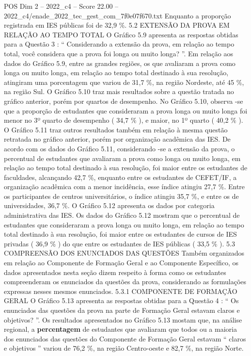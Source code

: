 \begin{textsample}{POS Dim 2 – 2022\_c4 – Score 22.00 – 2022\_c4/enade\_2022\_tec\_gest\_com\_7f0e07f670.txt}
Enquanto a proporção registrada em IES públicas foi de 32,9 \%. 5.2 EXTENSÃO DA PROVA EM RELAÇÃO AO TEMPO TOTAL O Gráfico 5.9 apresenta as respostas obtidas para a Questão 3 : “ Considerando a extensão da prova, em relação ao tempo total, você considera que a prova foi longa ou muito longa? ”.
Em relação aos dados do Gráfico 5.9, entre as grandes regiões, os que avaliaram a prova como longa ou muito longa, em relação ao tempo total destinado à sua resolução, atingiram uma porcentagem que variou de 31,7 \%, na região Nordeste, até 45 \%, na região Sul.
O Gráfico 5.10 traz mais resultados sobre a questão tratada no gráfico anterior, porém por quartos de desempenho.
No Gráfico 5.10, observa -se que a proporção de estudantes que consideraram a prova longa ou muito longa foi menor no 3º quarto de desempenho ( 34,7 \% ), e maior, no 1º quarto ( 40,2 \% ).
O Gráfico 5.11 traz outros resultados também em relação à mesma questão retratada no gráfico anterior, porém por organização acadêmica das IES.
De acordo com os dados do Gráfico 5.11, considerando -se a extensão da prova, o percentual de estudantes que avaliaram a prova como longa ou muito longa, em relação ao tempo total destinado à sua resolução, foi maior entre os estudantes de faculdades, alcançando 42,7 \%, enquanto entre os estudantes de CEFET/IF, a organização acadêmica com a menor incidência, esse índice atingiu 27,7 \%.
Entre os participantes de centros universitários, o índice atingiu 35,7 \%, e entre os de universidades, 36,7 \%.
O Gráfico 5.12 apresenta os dados por categoria administrativa das IES.
Os dados do Gráfico 5.12 mostram que o percentual de estudantes que consideraram a prova longa ou muito longa, em relação ao tempo total destinado à sua resolução, foi maior entre os estudantes de cursos de IES privadas ( 36,9 \% ) do que entre os estudantes de IES públicas ( 33,5 \% ). 5.3 COMPREENSÃO DOS ENUNCIADOS DAS QUESTÕES Também organizados em relação ao Componente de Formação Geral e ao Componente Específico, os dados apresentados nesta seção dizem respeito à forma como os estudantes compreenderam os enunciados da questões da prova, considerando as formulações expressas nesses mesmos enunciados. 5.3.1 COMPONENTE DE FORMAÇÃO GERAL O Gráfico 5.13 apresenta as respostas obtidas para a Questão 4 : “ Os enunciados das questões da prova na parte de Formação Geral estavam claros e objetivos? ”.
Os resultados apresentados no Gráfico 5.13 mostam que, na análise regional, a \textbf{percentagem} de estudantes que avaliaram que todos ou a maioria dos enunciados das questões do Componente de Formação Geral estavam “ claros e objetivos ” variou de 76,2 \%, na região Centro-oeste e 82,7 \%, na região Norte.

\end{textsample}
